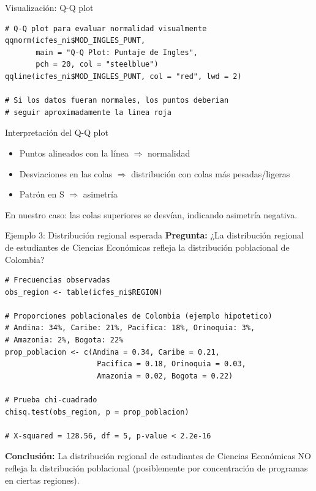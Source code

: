 \documentclass[aspectratio=169, 11pt]{beamer}
\begin{document}
\begin{frame}[fragile]{Visualización: Q-Q plot}
\begin{lstlisting}
# Q-Q plot para evaluar normalidad visualmente
qqnorm(icfes_ni$MOD_INGLES_PUNT,
       main = "Q-Q Plot: Puntaje de Ingles",
       pch = 20, col = "steelblue")
qqline(icfes_ni$MOD_INGLES_PUNT, col = "red", lwd = 2)

# Si los datos fueran normales, los puntos deberian
# seguir aproximadamente la linea roja
\end{lstlisting}

\vspace{0.2cm}
\begin{block}{Interpretación del Q-Q plot}
\begin{itemize}
  \item Puntos alineados con la línea $\Rightarrow$ normalidad
  \item Desviaciones en las colas $\Rightarrow$ distribución con colas más pesadas/ligeras
  \item Patrón en S $\Rightarrow$ asimetría
\end{itemize}
\end{block}

En nuestro caso: las colas superiores se desvían, indicando asimetría negativa.
\end{frame}

\begin{frame}[fragile]{Ejemplo 3: Distribución regional esperada}
\textbf{Pregunta:} ¿La distribución regional de estudiantes de Ciencias Econ\'omicas refleja la distribución poblacional de Colombia?

\begin{lstlisting}[basicstyle=\ttfamily\scriptsize]
# Frecuencias observadas
obs_region <- table(icfes_ni$REGION)

# Proporciones poblacionales de Colombia (ejemplo hipotetico)
# Andina: 34%, Caribe: 21%, Pacifica: 18%, Orinoquia: 3%,
# Amazonia: 2%, Bogota: 22%
prop_poblacion <- c(Andina = 0.34, Caribe = 0.21,
                     Pacifica = 0.18, Orinoquia = 0.03,
                     Amazonia = 0.02, Bogota = 0.22)

# Prueba chi-cuadrado
chisq.test(obs_region, p = prop_poblacion)

# X-squared = 128.56, df = 5, p-value < 2.2e-16
\end{lstlisting}

\textbf{Conclusión:} La distribución regional de estudiantes de Ciencias Econ\'omicas NO refleja la distribución poblacional (posiblemente por concentración de programas en ciertas regiones).
\end{frame}
\end{document}
